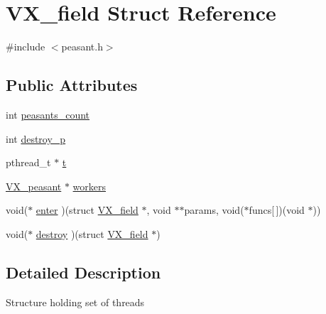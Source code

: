 \hypertarget{structVX__field}{\section{V\-X\-\_\-field Struct Reference}
\label{structVX__field}
}


{\ttfamily \#include $<$peasant.\-h$>$}

\subsection*{Public Attributes}
\begin{DoxyCompactItemize}
\item 
int \hyperlink{structVX__field_aabbf8f87f0599a512d81954691d10a1e}{peasants\-\_\-count}
\item 
int \hyperlink{structVX__field_aadc61b8bd336815e43cc25babdb0b6d1}{destroy\-\_\-p}
\item 
pthread\-\_\-t $\ast$ \hyperlink{structVX__field_a50a4a8795f8bc85dae98a3ef413f493a}{t}
\item 
\hyperlink{structVX__peasant}{V\-X\-\_\-peasant} $\ast$ \hyperlink{structVX__field_a9d3d1235edb09fba04688449f8a880c0}{workers}
\item 
void($\ast$ \hyperlink{structVX__field_ac756ab3ee46139af68db93921e21d404}{enter} )(struct \hyperlink{structVX__field}{V\-X\-\_\-field} $\ast$, void $\ast$$\ast$params, void($\ast$funcs\mbox{[}$\,$\mbox{]})(void $\ast$))
\item 
void($\ast$ \hyperlink{structVX__field_a97d0409224ba04e9ec538147d5b90638}{destroy} )(struct \hyperlink{structVX__field}{V\-X\-\_\-field} $\ast$)
\end{DoxyCompactItemize}


\subsection{Detailed Description}
Structure holding set of threads 

